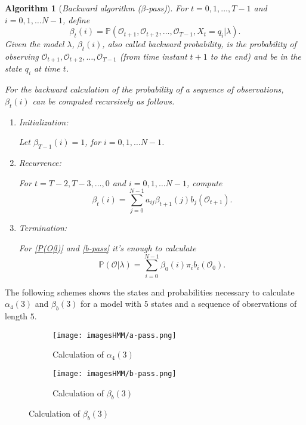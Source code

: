 \documentclass[12pt]{article}
\newtheorem{algorithm2}{Algorithm}
\def\OO{\mathcal{O}}
\def\PP{\mathbb{P}}
\numberwithin{equation}{section}
\begin{document}
\begin{algorithm2}[\emph{Backward algorithm (}$\beta$\emph{-pass)}]\label{b-pass algorithm}
\normalfont For $t = 0,1, \dots, T-1$ and $i = 0,1, \dots N-1$, define
\begin{equation}\label{b-pass}
    \beta_{t}(i) = \PP(\OO_{t+1}, \OO_{t+2}, \dots, \OO_{T-1}, X_{t} = q_{i} | \lambda).
\end{equation}
Given the model $\lambda$, $\beta_{t}(i)$, also called \emph{backward probability}, is the probability of observing $\OO_{t+1}, \OO_{t+2}, \dots, \OO_{T-1}$ (from time instant $t+1$ to the end) and be in the state $q_{i}$ at time $t$.

For the backward calculation of the probability of a sequence of observations, $\beta_{t}(i)$ can be computed recursively as follows.
\begin{enumerate}
    \item Initialization:

    Let $\beta_{T-1}(i) = 1$, for $i = 0,1, \dots N-1$.

    \item Recurrence:

    For $t = T-2,T-3, \dots, 0$ and $i = 0,1, \dots N-1$, compute
    \[\beta_{t}(i) = \sum_{j=0}^{N-1}a_{ij} \beta_{t+1}(j)  b_{j}(\OO_{t+1}).\]

    \item Termination:

    For \ref{P(O|l)} and \ref{b-pass} it's enough to calculate
    \[\PP(\OO|\lambda) = \sum_{i=0}^{N-1}\beta_{0}(i) \pi_{i} b_{i}(\OO_{0}).\]
\end{enumerate}
\end{algorithm2}

The following schemes shows the states and probabilities necessary to calculate $\alpha_{4}(3)$ and $\beta_{b}(3)$ for a model with $5$ states and a sequence of observations of length $5$.
\begin{figure}[H]
\centering
\begin{subfigure}[b]{0.45\linewidth}
\texttt{[image: imagesHMM/a-pass.png]}
\caption{Calculation of $\alpha_{4}(3)$}
\label{fig:calculation a}
\end{subfigure}
\hfill
\begin{subfigure}[b]{0.45\linewidth}
\texttt{[image: imagesHMM/b-pass.png]}
\caption{Calculation of $\beta_{b}(3)$}
\label{fig:calculation b}
\end{subfigure}
\end{figure}
\end{document}
